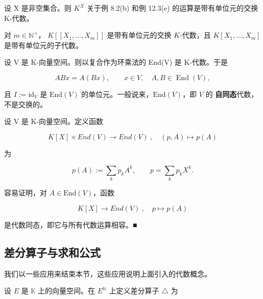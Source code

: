 \begin{example}

\begin{items}
\item

设 X 是非空集合。则  $ K^X $ 关于例 8.2(b) 和例 12.3(e) 的运算是带有单位元的交换 K-代数。

\item

对  $ m \in \mathbb{N}^\times $， $ K[\![X_1, \ldots, X_m]\!] $ 是带有单位元的交换  $ K $-代数，且  $ K[X_1, \ldots, X_m] $ 是带有单位元的子代数。

\item

设 V 是 K-向量空间。则以复合作为环乘法的 End(V) 是 K-代数。于是

\[
A B x=A(B x),\qquad x\in V,\quad A,B\in\operatorname{E n d}(V),
\]

且 $I := \mathrm{id}_{V}$ 是 $\mathrm{End}(V)$ 的单位元。一般说来，$\mathrm{End}(V)$，即 $V$ 的 \textbf{自同态}代数，不是交换的。

\end{items}

\end{example}

\begin{remark}

设 V 是 K-向量空间。定义函数

\[
K[X]\times End(V)\to End(V)~,\quad(p,A)\mapsto p(A)
\]

为

\begin{equation}
p(A):=\sum_{k}p_{k}A^{k},\qquad p=\sum_{k}p_{k}X^{k}.
\end{equation}

容易证明，对 $A \in \mathrm{End}(V)$，函数

\[
K[X]\to End(V)~,\quad p\mapsto p(A)
\]

是代数同态，即它与所有代数运算相容。■

\end{remark}

\subsection*{差分算子与求和公式}

我们以一些应用来结束本节，这些应用说明上面引入的代数概念。

设 $E$ 是 $\mathbb{K}$ 上的向量空间。在 $E^{\mathbb{N}}$ 上定义差分算子 $\triangle$ 为

